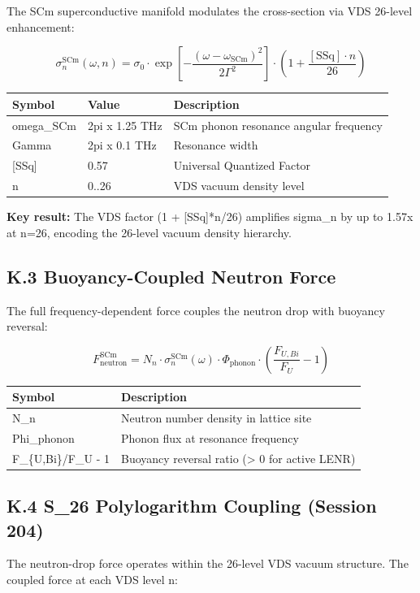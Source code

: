 \documentclass[11pt]{article}
\begin{document}
The SCm superconductive manifold modulates the cross-section via VDS 26-level enhancement:

$$\sigma_n^{\mathrm{SCm}}(\omega, n) = \sigma_0 \cdot \exp\!\left[-\frac{(\omega - \omega_{\mathrm{SCm}})^2}{2\Gamma^2}\right] \cdot \left(1 + \frac{[\text{SSq}] \cdot n}{26}\right)$$

\begin{center}
\begin{longtable}{lll}
\toprule
Symbol & Value & Description \tabularnewline
\midrule
\endhead
omega\_SCm & 2pi x 1.25 THz & SCm phonon resonance angular frequency \tabularnewline
Gamma & 2pi x 0.1 THz & Resonance width \tabularnewline
{}[SSq] & 0.57 & Universal Quantized Factor \tabularnewline
n & 0..26 & VDS vacuum density level \tabularnewline
\bottomrule
\end{longtable}
\end{center}

\textbf{Key result:} The VDS factor (1 + [SSq]*n/26) amplifies sigma\_n by up to 1.57x at n=26, encoding the 26-level vacuum density hierarchy.

\subsection*{K.3 Buoyancy-Coupled Neutron Force}

The full frequency-dependent force couples the neutron drop with buoyancy reversal:

$$F_{\mathrm{neutron}}^{\mathrm{SCm}} = N_n \cdot \sigma_n^{\mathrm{SCm}}(\omega) \cdot \Phi_{\mathrm{phonon}} \cdot \left(\frac{F_{U,Bi}}{F_U} - 1\right)$$

\begin{center}
\begin{longtable}{ll}
\toprule
Symbol & Description \tabularnewline
\midrule
\endhead
N\_n & Neutron number density in lattice site \tabularnewline
Phi\_phonon & Phonon flux at resonance frequency \tabularnewline
F\_\{U,Bi\}/F\_U - 1 & Buoyancy reversal ratio (> 0 for active LENR) \tabularnewline
\bottomrule
\end{longtable}
\end{center}

\subsection*{K.4 S\_26 Polylogarithm Coupling (Session 204)}

The neutron-drop force operates within the 26-level VDS vacuum structure. The coupled force at each VDS level n:
\end{document}
